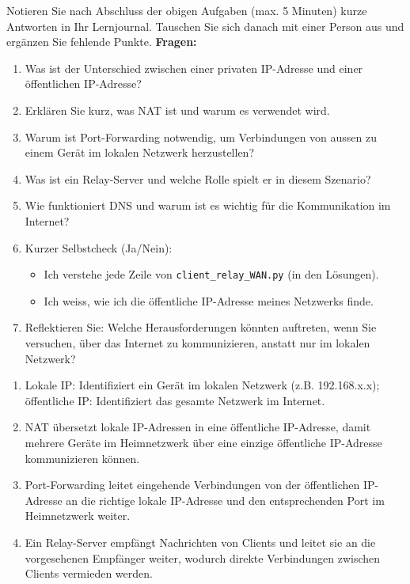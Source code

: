 \begin{myexercise}
    [Reflexionsfragen]
    Notieren Sie nach Abschluss der obigen Aufgaben (max. 5 Minuten) kurze Antworten in Ihr Lernjournal. Tauschen Sie sich danach mit einer Person aus und ergänzen Sie fehlende Punkte.
    \textbf{Fragen:}
    \begin{enumerate}
        \item Was ist der Unterschied zwischen einer privaten \gls{IP}-Adresse und einer öffentlichen \gls{IP}-Adresse?
        \item Erklären Sie kurz, was \gls{NAT} ist und warum es verwendet wird.
        \item Warum ist Port-Forwarding notwendig, um Verbindungen von aussen zu einem Gerät im lokalen Netzwerk herzustellen?
        \item Was ist ein Relay-Server und welche Rolle spielt er in diesem Szenario?
        \item Wie funktioniert \gls{DNS} und warum ist es wichtig für die Kommunikation im Internet?
        \item Kurzer Selbstcheck (Ja/Nein):
              \begin{itemize}
                  \item Ich verstehe jede Zeile von \texttt{client\_relay\_WAN.py} (in den Lösungen).
                  \item Ich weiss, wie ich die öffentliche IP-Adresse meines Netzwerks finde.
              \end{itemize}
        \item Reflektieren Sie: Welche Herausforderungen könnten auftreten, wenn Sie versuchen, über das Internet zu kommunizieren, anstatt nur im lokalen Netzwerk?
    \end{enumerate}
    \begin{myanswer}
        \begin{enumerate}
            \item Lokale IP: Identifiziert ein Gerät im lokalen Netzwerk (z.B. 192.168.x.x); öffentliche IP: Identifiziert das gesamte Netzwerk im Internet.
            \item NAT übersetzt lokale IP-Adressen in eine öffentliche IP-Adresse, damit mehrere Geräte im Heimnetzwerk über eine einzige öffentliche IP-Adresse kommunizieren können.
            \item Port-Forwarding leitet eingehende Verbindungen von der öffentlichen IP-Adresse an die richtige lokale IP-Adresse und den entsprechenden Port im Heimnetzwerk weiter.
            \item Ein Relay-Server empfängt Nachrichten von Clients und leitet sie an die vorgesehenen Empfänger weiter, wodurch direkte Verbindungen zwischen Clients vermieden werden.

\end{enumerate}
\end{myanswer}
\end{myexercise}

